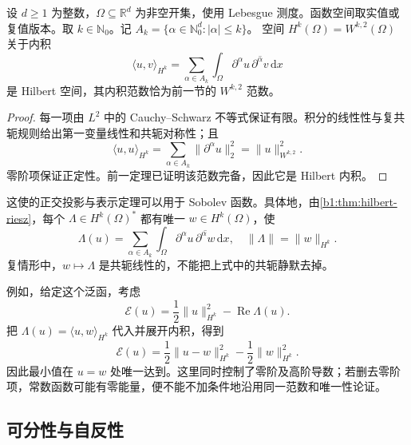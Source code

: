 \begin{corollary}\label{b1:cor:sobolev-hilbert}
设 \(d\geq1\) 为整数，\(\Omega\subseteq\mathbb R^d\) 为非空开集，使用 Lebesgue 测度。函数空间取实值或复值版本。取 \(k\in\mathbb N_0\)。记 \(A_k=\{\alpha\in\mathbb N_0^d:|\alpha|\leq k\}\)。
空间 \(H^k(\Omega)=W^{k,2}(\Omega)\) 关于内积
\[
 \langle u,v\rangle_{H^k}
 =\sum_{\alpha\in A_k}
   \int_\Omega\partial^\alpha u\,\overline{\partial^\alpha v}\,\mathrm dx
\]
是 Hilbert 空间，其内积范数恰为前一节的 \(W^{k,2}\) 范数。
\end{corollary}
\begin{proof}
每一项由 \(L^2\) 中的 Cauchy--Schwarz 不等式保证有限。积分的线性性与复共轭规则给出第一变量线性和共轭对称性；且
\[
 \langle u,u\rangle_{H^k}
 =\sum_{\alpha\in A_k}\|\partial^\alpha u\|_2^2
 =\|u\|_{W^{k,2}}^2.
\]
零阶项保证正定性。前一定理已证明该范数完备，因此它是 Hilbert 内积。
\end{proof}

这使的正交投影与表示定理可以用于 Sobolev 函数。具体地，由\cref{b1:thm:hilbert-riesz}，每个 \(\Lambda\in H^k(\Omega)^*\) 都有唯一 \(w\in H^k(\Omega)\)，使
\[
 \Lambda(u)=\sum_{\alpha\in A_k}
       \int_\Omega\partial^\alpha u\,\overline{\partial^\alpha w}\,\mathrm dx,
 \quad \|\Lambda\|=\|w\|_{H^k}.
\]
复情形中，\(w\mapsto\Lambda\) 是共轭线性的，不能把上式中的共轭静默去掉。

\ProseParagraphBreak

例如，给定这个泛函，考虑
\[
 \mathcal E(u)=\dfrac12\|u\|_{H^k}^2-\operatorname{Re}\Lambda(u).
\]
把 \(\Lambda(u)=\langle u,w\rangle_{H^k}\) 代入并展开内积，得到
\[
 \mathcal E(u)=\dfrac12\|u-w\|_{H^k}^2-\dfrac12\|w\|_{H^k}^2.
\]
因此最小值在 \(u=w\) 处唯一达到。这里同时控制了零阶及高阶导数；若删去零阶项，常数函数可能有零能量，便不能不加条件地沿用同一范数和唯一性论证。

\subsection{可分性与自反性}
\label{b1:subsec:210203}

